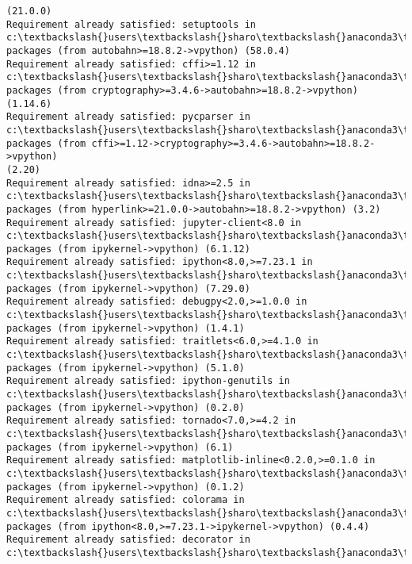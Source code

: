\documentclass[11pt]{article}
\begin{document}
\begin{Verbatim}[commandchars=\\\{\}]
(21.0.0)
Requirement already satisfied: setuptools in c:\textbackslash{}users\textbackslash{}sharo\textbackslash{}anaconda3\textbackslash{}lib\textbackslash{}site-
packages (from autobahn>=18.8.2->vpython) (58.0.4)
Requirement already satisfied: cffi>=1.12 in c:\textbackslash{}users\textbackslash{}sharo\textbackslash{}anaconda3\textbackslash{}lib\textbackslash{}site-
packages (from cryptography>=3.4.6->autobahn>=18.8.2->vpython) (1.14.6)
Requirement already satisfied: pycparser in c:\textbackslash{}users\textbackslash{}sharo\textbackslash{}anaconda3\textbackslash{}lib\textbackslash{}site-
packages (from cffi>=1.12->cryptography>=3.4.6->autobahn>=18.8.2->vpython)
(2.20)
Requirement already satisfied: idna>=2.5 in c:\textbackslash{}users\textbackslash{}sharo\textbackslash{}anaconda3\textbackslash{}lib\textbackslash{}site-
packages (from hyperlink>=21.0.0->autobahn>=18.8.2->vpython) (3.2)
Requirement already satisfied: jupyter-client<8.0 in
c:\textbackslash{}users\textbackslash{}sharo\textbackslash{}anaconda3\textbackslash{}lib\textbackslash{}site-packages (from ipykernel->vpython) (6.1.12)
Requirement already satisfied: ipython<8.0,>=7.23.1 in
c:\textbackslash{}users\textbackslash{}sharo\textbackslash{}anaconda3\textbackslash{}lib\textbackslash{}site-packages (from ipykernel->vpython) (7.29.0)
Requirement already satisfied: debugpy<2.0,>=1.0.0 in
c:\textbackslash{}users\textbackslash{}sharo\textbackslash{}anaconda3\textbackslash{}lib\textbackslash{}site-packages (from ipykernel->vpython) (1.4.1)
Requirement already satisfied: traitlets<6.0,>=4.1.0 in
c:\textbackslash{}users\textbackslash{}sharo\textbackslash{}anaconda3\textbackslash{}lib\textbackslash{}site-packages (from ipykernel->vpython) (5.1.0)
Requirement already satisfied: ipython-genutils in
c:\textbackslash{}users\textbackslash{}sharo\textbackslash{}anaconda3\textbackslash{}lib\textbackslash{}site-packages (from ipykernel->vpython) (0.2.0)
Requirement already satisfied: tornado<7.0,>=4.2 in
c:\textbackslash{}users\textbackslash{}sharo\textbackslash{}anaconda3\textbackslash{}lib\textbackslash{}site-packages (from ipykernel->vpython) (6.1)
Requirement already satisfied: matplotlib-inline<0.2.0,>=0.1.0 in
c:\textbackslash{}users\textbackslash{}sharo\textbackslash{}anaconda3\textbackslash{}lib\textbackslash{}site-packages (from ipykernel->vpython) (0.1.2)
Requirement already satisfied: colorama in c:\textbackslash{}users\textbackslash{}sharo\textbackslash{}anaconda3\textbackslash{}lib\textbackslash{}site-
packages (from ipython<8.0,>=7.23.1->ipykernel->vpython) (0.4.4)
Requirement already satisfied: decorator in c:\textbackslash{}users\textbackslash{}sharo\textbackslash{}anaconda3\textbackslash{}lib\textbackslash{}site-

\end{Verbatim}
\end{document}
